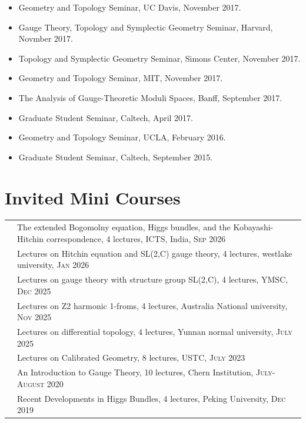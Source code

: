 \documentclass[a4paper,10pt]{article}
\begin{document}
\begin{itemize}[leftmargin=1.5cm]
    \item Geometry and Topology Seminar, UC Davis, November 2017.
    \item Gauge Theory, Topology and Symplectic Geometry Seminar, Harvard, Novmber 2017.
    \item Topology and Symplectic Geometry Seminar, Simons Center, November 2017.
    \item Geometry and Topology Seminar, MIT, November 2017.
    \item The Analysis of Gauge-Theoretic Moduli Spaces, Banff, September 2017.
    \item Graduate Student Seminar, Caltech, April 2017.
    \item Geometry and Topology Seminar, UCLA, February 2016.
    \item Graduate Student Seminar, Caltech, September 2015.
\end{itemize}

\section*{Invited Mini Courses}
\begin{tabular}{rl}
    &\parbox[t]{\dimexpr\textwidth-4\tabcolsep\relax}{The extended Bogomolny equation, Higgs bundles, and the Kobayashi-Hitchin correspondence, 4 lectures, ICTS, India, \textsc{Sep 2026}}\\
   &Lectures on Hitchin equation and SL(2,C) gauge theory, 4 lectures, westlake university, \textsc{Jan 2026}\\
    &Lectures on gauge theory with structure group SL(2,C), 4 lectures, YMSC, \textsc{Dec 2025}\\
    &Lectures on Z2 harmonic 1-froms, 4 lectures, Australia National university, \textsc{Nov 2025}\\
    &Lectures on differential topology, 4 lectures, Yunnan normal university, \textsc{July 2025}\\
    &Lectures on Calibrated Geometry,  8 lectures, USTC, \textsc{July 2023} \\
    &An Introduction to Gauge Theory,  10 lectures, Chern Institution, \textsc{July-August 2020} \\
    &Recent Developments in Higgs Bundles,  4 lectures, Peking University, \textsc{Dec 2019} \\
\end{tabular}

\end{document}
